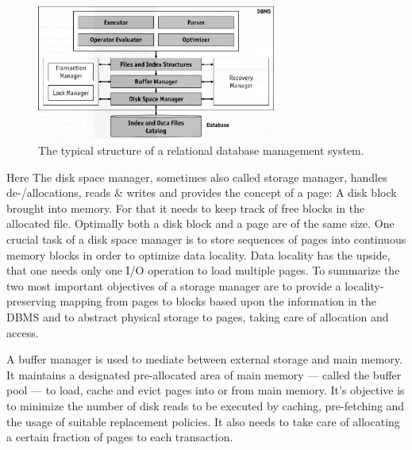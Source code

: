         \begin{figure}[htp]
        \begin{center}
        \includegraphics[keepaspectratio,width=0.7\textwidth]{img/00_intro/RDBMS.png}
        \end{center}
        \caption{The typical structure of a relational database management system.} %
        \label{dbms_arch}
        \end{figure}

        Here The disk space manager, sometimes also called storage manager, handles de-/allocations, reads \& writes and provides the concept of a page: A disk block brought into memory. 
        For that it needs to keep track of free blocks in the allocated file. Optimally both a disk block and a page are of the same size. 
        One crucial task of a disk space manager is to store sequences of pages into continuous memory blocks in order to optimize data locality.
        Data locality has the upside, that one needs only one I/O operation to load multiple pages.
        To summarize the two most important objectives of a storage manager are to provide a locality-preserving mapping from pages to blocks based upon the information in the DBMS and to abstract physical storage to pages, taking care of allocation and access.
        
        A buffer manager is used to mediate between external storage and main memory. It maintains a designated pre-allocated area of main memory --- called the buffer pool --- to load, cache and evict pages into or from main memory.
        It's objective is to minimize the number of disk reads to be executed by caching, pre-fetching and the usage of suitable replacement policies. 
        It also needs to take care of allocating a certain fraction of pages to each transaction.

